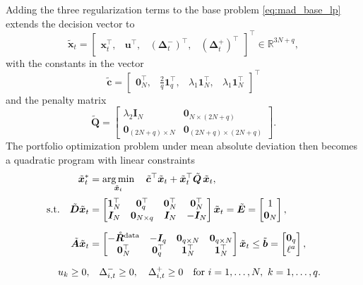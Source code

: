 Adding the three regularization terms to the base problem \eqref{eq:mad_base_lp} extends the decision vector to
\begin{equation*}
    \tilde{\bm{x}}_t = \begin{bmatrix} \bm{x}_t^\top,& \bm{u}^\top,& (\bm{\Delta}_t^-)^\top,& (\bm{\Delta}_t^+)^\top \end{bmatrix}^\top
    \in \mathbb{R}^{3N+q},
\end{equation*}
with the constants in the vector
\begin{equation*}
    \tilde{\bm{c}} = \begin{bmatrix} \bm{0}_N^\top,& \tfrac{2}{q} \bm{1}_q^\top,& \lambda_1 \bm{1}_N^\top,& \lambda_1 \bm{1}_N^\top \end{bmatrix}^\top
\end{equation*}
and the penalty matrix
\begin{equation*}
    \tilde{\bm{Q}} =
    \begin{bmatrix}
        \lambda_2 \bm{I}_N & \bm{0}_{N \times (2N+q)} \\
        \bm{0}_{(2N+q) \times N} & \bm{0}_{(2N+q) \times (2N+q)}
    \end{bmatrix}.
\end{equation*}
The portfolio optimization problem under mean absolute deviation then becomes a quadratic program with linear
constraints
\begin{equation} \label{eq:mad_reg_qp}
\begin{aligned}
    \tilde{\bm{x}}_t^* &= \operatorname*{arg\,min}_{\tilde{\bm{x}}_t} \quad
    \tilde{\bm{c}}^\top \tilde{\bm{x}}_t + \tilde{\bm{x}}_t^\top \tilde{\bm{Q}}\, \tilde{\bm{x}}_t, \\[2pt]
    \text{s.t.} \quad
     \tilde{\bm{D}} \tilde{\bm{x}}_t &=
    \begin{bmatrix} \bm{1}_N^\top & \bm{0}_q^\top & \bm{0}_N^\top & \bm{0}_N^\top \\
    \bm{I}_N & \bm{0}_{N \times q} & \bm{I}_N & -\bm{I}_N \end{bmatrix} \tilde{\bm{x}}_t
    = \tilde{\bm{E}} = \begin{bmatrix} 1 \\ \bm{0}_N \end{bmatrix}, \\[6pt]
     \tilde{\bm{A}} \tilde{\bm{x}}_t &=
    \begin{bmatrix} -\mathring{\bm{R}}^{\text{data}} & -\bm{I}_q & \bm{0}_{q \times N} & \bm{0}_{q \times N} \\
    \bm{0}_N^\top & \bm{0}_q^\top & \bm{1}_N^\top & \bm{1}_N^\top \end{bmatrix} \tilde{\bm{x}}_t
    \le \tilde{\bm{b}} = \begin{bmatrix} \bm{0}_q \\ \ell^a \end{bmatrix}, \\[6pt]
     u_k \ge 0, & \quad \Delta_{i,t}^- \ge 0,\quad \Delta_{i,t}^+ \ge 0
    \quad \text{for } i = 1, \dots, N,\ k = 1, \dots, q.
\end{aligned}
\end{equation}
